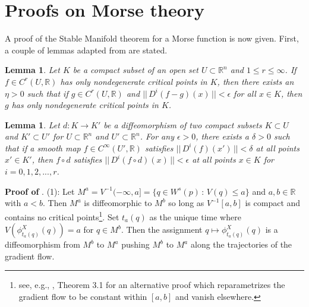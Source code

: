 \documentclass[12pt]{article}
\newtheorem{lemma}[theorem]{Lemma}
\begin{document}
\section{Proofs on Morse theory}
\label{appendix:Morse-theory}

A proof of the Stable Manifold theorem for a Morse function is now given. First, a couple of lemmas adapted from \cite{milnor2025lectures} are stated. 

\begin{lemma}
\label{lemma:good-critical-points-milnor}
    Let $K$ be a compact subset of an open set $U \subset \mathbb{R}^n$ and $1 \leq r \leq \infty$. If $f\in C^r(U,\mathbb{R})$ has only nondegenerate critical points in $K$, then there exists an $\eta >0$ such that if $g\in C^r(U,\mathbb{R})$ and $|| \, D^i(f-g)(x) \, || < \epsilon$ for all $x\in K$, then $g$ has only nondegenerate critical points in $K$.
\end{lemma}

\begin{lemma}
\label{lemma:density-critical-points-milnor}
    Let $d: K \rightarrow K'$ be a diffeomorphism of two compact subsets $K\subset U$ and $K'\subset U'$ for $U \subset \mathbb{R}^n$ and $U' \subset \mathbb{R}^n$. For any $\epsilon>0$, there exists a $\delta>0$ such that if a smooth map $f\in C^{\infty}(U', \mathbb{R})$ satisfies $|| \, D^i(f)(x') \, || < \delta$
    at all points $x'\in K'$, then $f \circ d$ satisfies $|| \, D^i(f\circ d)(x) \, || < \epsilon$
    at all points $x\in K$ for $i=0,1,2,...,r$.
\end{lemma}

\vspace{0.5em}
\noindent
{\bf Proof of }.
  (1): Let $M^{a} = V^{-1}(-\infty,a] = \{q \in W^s(p) \, : \, V(q) \leq a\}$ and $a,b \in \mathbb{R}$ with $a < b$. Then $M^a$ is diffeomorphic to $M^b$ so long as $V^{-1}[a,b]$ is compact and contains no critical points\footnote{see, e.g., \cite{milnor2016morse}, Theorem 3.1 for an alternative proof which reparametrizes the gradient flow to be constant within $[a,b]$ and vanish elsewhere.}. Set $t_a(q)$ as the unique time where $V(\phi_{t_a(q)}^X(q)) = a$ for $q \in M^b$. Then the assignment $q \mapsto \phi_{t_a(q)}^X(q)$ is a diffeomorphism from $M^b$ to $M^a$ pushing $M^b$ to $M^a$ along the trajectories of the gradient flow.
\end{document}
